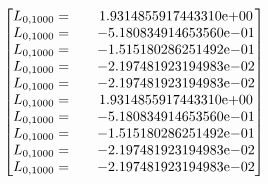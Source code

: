 \begin{enumerate}
\begin{itemize}
$$
\begin{bmatrix}
L_{0,1000}=  & \quad {1.9314855917443310}\mathrm{e}{+00}\\
L_{0,1000}=  & \quad {-5.180834914653560}\mathrm{e}{-01}\\
L_{0,1000}=  & \quad {-1.515180286251492}\mathrm{e}{-01}\\
L_{0,1000}=  & \quad {-2.197481923194983}\mathrm{e}{-02}\\
L_{0,1000}=  & \quad {-2.197481923194983}\mathrm{e}{-02}\\
L_{0,1000}=  & \quad {1.9314855917443310}\mathrm{e}{+00}\\
L_{0,1000}=  & \quad {-5.180834914653560}\mathrm{e}{-01}\\
L_{0,1000}=  & \quad {-1.515180286251492}\mathrm{e}{-01}\\
L_{0,1000}=  & \quad {-2.197481923194983}\mathrm{e}{-02}\\
L_{0,1000}=  & \quad {-2.197481923194983}\mathrm{e}{-02}\\
\end{bmatrix}
$$
\end{itemize}
\end{enumerate}

